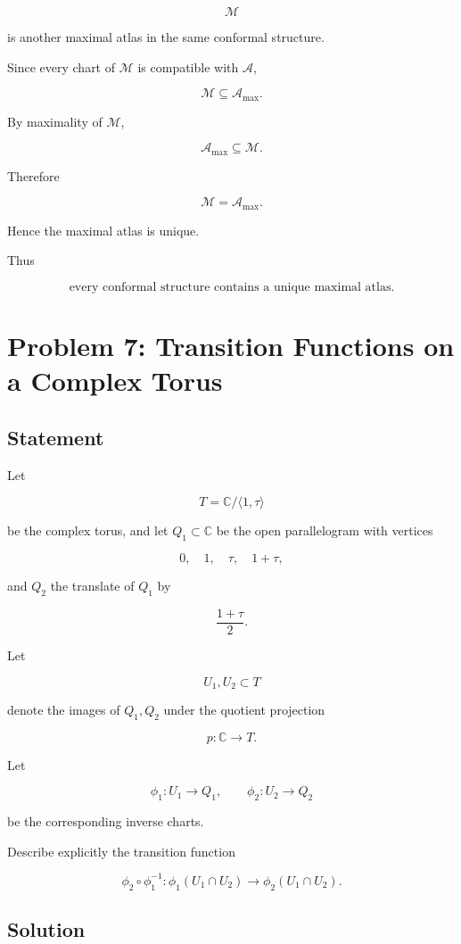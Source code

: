 \documentclass[12pt,a4paper]{article}
\theoremstyle{notespace}
\begin{document}
\[
\mathcal M
\]

is another maximal atlas in the same conformal structure.

Since every chart of \(\mathcal M\) is compatible with \(\mathcal A\),

\[
\mathcal M
\subseteq
\mathcal A_{\max}.
\]

By maximality of \(\mathcal M\),

\[
\mathcal A_{\max}
\subseteq
\mathcal M.
\]

Therefore

\[
\mathcal M
=
\mathcal A_{\max}.
\]

Hence the maximal atlas is unique.

Thus

\[
\boxed{
	\text{every conformal structure contains a unique maximal atlas.}
}
\]	
	
\section{Problem 7: Transition Functions on a Complex Torus}

\subsection*{Statement}

Let

\[
T=\mathbb C/\langle 1,\tau\rangle
\]

be the complex torus, and let \(Q_1\subset\mathbb C\) be the open parallelogram with vertices

\[
0,\quad 1,\quad \tau,\quad 1+\tau,
\]

and \(Q_2\) the translate of \(Q_1\) by

\[
\frac{1+\tau}{2}.
\]

Let

\[
U_1,U_2\subset T
\]

denote the images of \(Q_1,Q_2\) under the quotient projection

\[
p:\mathbb C\to T.
\]

Let

\[
\phi_1:U_1\to Q_1,
\qquad
\phi_2:U_2\to Q_2
\]

be the corresponding inverse charts.

Describe explicitly the transition function

\[
\phi_2\circ\phi_1^{-1}:
\phi_1(U_1\cap U_2)
\to
\phi_2(U_1\cap U_2).
\]

\subsection*{Solution}
\end{document}
